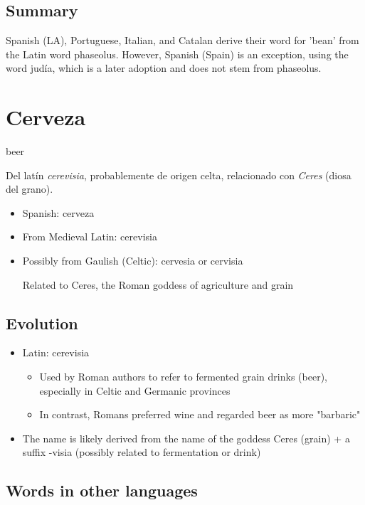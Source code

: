 \documentclass[10pt]{book}
\newcommand{\wordentry}[2]{
	\large #1
	\vspace{-0.5em}
	\begin{etymologybox}
		#2
	\end{etymologybox}
}
\let\oldsection\section
\renewcommand{\section}[1]{
	\needspace{8\baselineskip}
	\oldsection{#1}
}
\begin{document}
	\subsection{Summary}
	Spanish (LA), Portuguese, Italian, and Catalan derive their word for 'bean' from the Latin word phaseolus. However, Spanish (Spain) is an exception, using the word judía, which is a later adoption and does not stem from phaseolus.
	
	\section{Cerveza}
	\wordentry{beer}{
	Del latín \textit{cerevisia}, probablemente de origen celta, relacionado con \textit{Ceres} (diosa del grano).
	\begin{itemize}
		\item Spanish: cerveza
		\item From Medieval Latin: cerevisia
		\item Possibly from Gaulish (Celtic): cervesia or cervisia
		
		Related to Ceres, the Roman goddess of agriculture and grain
	\end{itemize}

	}

	\subsection{Evolution}
	
	\begin{itemize}
		\item Latin: cerevisia
		
		\begin{itemize}
			\item Used by Roman authors to refer to fermented grain drinks (beer), especially in Celtic and Germanic provinces
			\item In contrast, Romans preferred wine and regarded beer as more "barbaric"
		\end{itemize}
		\item The name is likely derived from the name of the goddess Ceres (grain) + a suffix -visia (possibly related to fermentation or drink)
	\end{itemize}
	
	\subsection*{Words in other languages}
	
\end{document}
